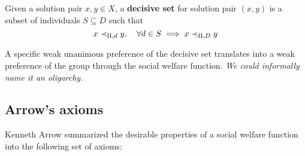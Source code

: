 \begin{definition}
	Given a solution pair $x,y \in X$, a \textbf{decisive set} for solution pair $(x, y)$ is a subset of individuals $S \subseteq D$ such that
	$$ x \prec_{\Pi, d} y, \quad \forall d \in S \implies x \prec_{\Pi, D} y $$
\end{definition}

A specific weak unanimous preference of the decisive set translates into a weak preference of the group through the social welfare function. \textit{We could informally name it an oligarchy.}

\subsection{Arrow's axioms}

Kenneth Arrow summarized the desirable properties of a social welfare function into the following set of axioms: 
